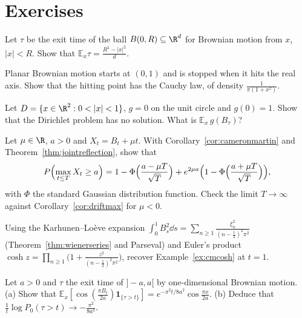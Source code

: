 \section{Exercises}

\begin{exercise}[$\star$]\label{ex:ballexit}
Let $\tau$ be the exit time of the ball $B(0,R)\subseteq\R^d$ for Brownian motion from $x$, $|x|<R$. Show that $\mathbb E_x\tau=\frac{R^2-|x|^2}d$.
\end{exercise}

\begin{exercise}[$\star$]\label{ex:halfplane}
Planar Brownian motion starts at $(0,1)$ and is stopped when it hits the real axis. Show that the hitting point has the Cauchy law, of density $\frac1{\pi(1+x^2)}$.
\end{exercise}

\begin{exercise}[$\star$]\label{ex:zaremba}
Let $D=\{x\in\R^2:0<|x|<1\}$, $g=0$ on the unit circle and $g(0)=1$. Show that the Dirichlet problem has no solution. What is $\mathbb E_x\,g(B_\tau)$?
\end{exercise}

\begin{exercise}[$\star\star$]\label{ex:driftmax}
Let $\mu\in\R$, $a>0$ and $X_t=B_t+\mu t$. With Corollary~\ref{cor:cameronmartin} and Theorem~\ref{thm:jointreflection}, show that
\[
P\Bigl(\max_{t\le T}X_t\ge a\Bigr)=1-\Phi\Bigl(\frac{a-\mu T}{\sqrt T}\Bigr)+e^{2\mu a}\Bigl(1-\Phi\Bigl(\frac{a+\mu T}{\sqrt T}\Bigr)\Bigr),
\]
with $\Phi$ the standard Gaussian distribution function. Check the limit $T\to\infty$ against Corollary~\ref{cor:driftmax} for $\mu<0$.
\end{exercise}

\begin{exercise}[$\star\star$]\label{ex:cmproduct}
Using the Karhunen--Lo\`eve expansion $\int_0^1B_s^2\dd s=\sum_{n\ge1}\frac{\xi_n^2}{(n-\frac12)^2\pi^2}$ (Theorem~\ref{thm:wienerseries} and Parseval) and Euler's product $\cosh z=\prod_{n\ge1}\bigl(1+\frac{z^2}{(n-\frac12)^2\pi^2}\bigr)$, recover
Example~\ref{ex:cmcosh} at $t=1$.
\end{exercise}

\begin{exercise}[$\star\star$]\label{ex:strip}
Let $a>0$ and $\tau$ the exit time of $]-a,a[$ by one-dimensional Brownian motion. (a) Show that $\mathbb E_x[\cos(\frac{\pi B_t}{2a})\mathbf 1_{\{\tau>t\}}]=e^{-\pi^2t/8a^2}\cos\frac{\pi x}{2a}$. (b) Deduce that
$\frac1t\log P_0(\tau>t)\to-\frac{\pi^2}{8a^2}$.
\end{exercise}

